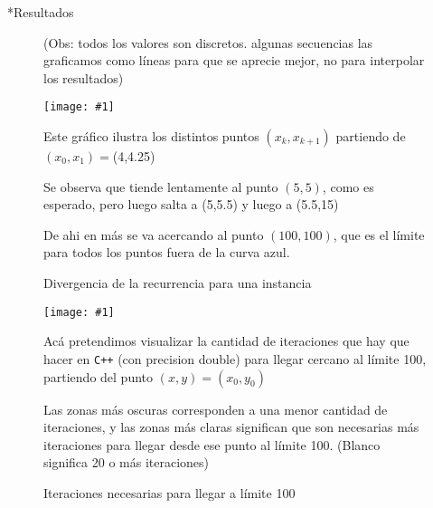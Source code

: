 \documentclass[12pt,titlepage]{article}
\newcommand{\gras}[2]{\noindent\texttt{[image: \#1]}\\}
\newenvironment{usection}[1]{\newpage\begin{section}*{#1}	\addcontentsline{toc}{section}{#1}}{\end{section}}
\begin{document}
\begin{usection}{Resultados}
\begin{figure}[H]
			(Obs: todos los valores son discretos. algunas secuencias las graficamos como líneas para que se aprecie mejor, no para interpolar los resultados)
		\end{figure}

		\begin{figure}[H]
			{\centering
			\caption{Divergencia de la recurrencia para una instancia}
			\label{fig:divergencia}
				\gras{fig_divergencia.png}{.7}}
			Este gráfico ilustra los distintos puntos $(x_k,x_{k+1})$ partiendo de $(x_0,x_1)=$(4,4.25)
			
			Se observa que tiende lentamente al punto $(5,5)$, como es esperado, pero luego salta a (5,5.5) y luego a (5.5,15)
			
			De ahi en más se va acercando al punto $(100,100)$, que es el límite para todos los puntos fuera de la curva azul.
		\end{figure}

		\begin{figure}[H]
			{\centering
			\caption{Iteraciones necesarias para llegar a límite 100}
			\label{fig:iteraciones}
				\gras{fig_iteraciones.png}{.5}}
			Acá pretendimos visualizar la cantidad de iteraciones que hay que hacer en \texttt{C++} (con precision double) para llegar cercano al límite 100, partiendo del punto $(x,y)=(x_0,y_0)$
			
			Las zonas más oscuras corresponden a una menor cantidad de iteraciones, y las zonas más claras significan que son necesarias más iteraciones para llegar desde ese punto al límite 100. (Blanco significa 20 o más iteraciones)
		\end{figure}

	\end{usection}
	
\end{document}
